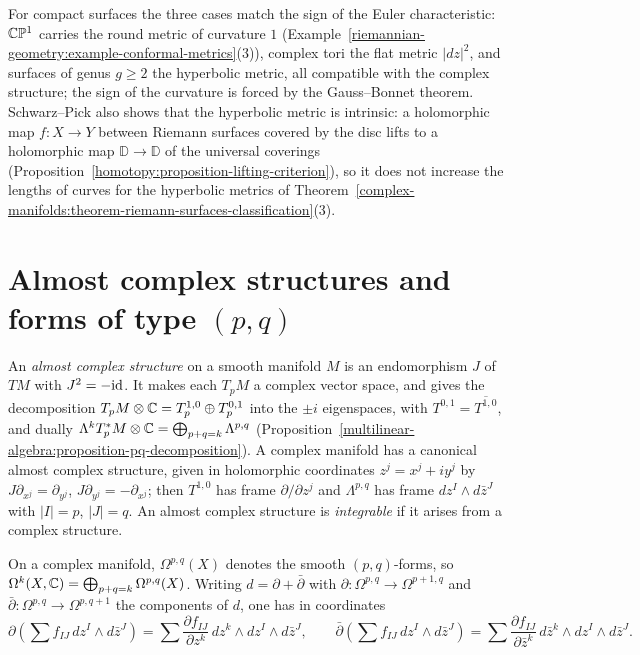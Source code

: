 \begin{remark}\label{complex-manifolds:remark-uniformisation-metrics}
For compact surfaces the three cases match the sign of the Euler characteristic: $\mathbb{C}\mathbb{P}^1$ carries the round metric of curvature $1$ (Example~\ref{riemannian-geometry:example-conformal-metrics}(3)),
complex tori the flat metric $|dz|^2$, and surfaces of genus $g \geq 2$ the hyperbolic metric, all compatible with the complex structure; the sign of the curvature is forced by the
Gauss--Bonnet theorem. Schwarz--Pick also shows that the hyperbolic metric is intrinsic: a holomorphic map $f \colon X \to Y$ between Riemann surfaces covered by the disc
lifts to a holomorphic map $\mathbb{D} \to \mathbb{D}$ of the universal coverings (Proposition~\ref{homotopy:proposition-lifting-criterion}), so it does not increase the lengths of
curves for the hyperbolic metrics of Theorem~\ref{complex-manifolds:theorem-riemann-surfaces-classification}(3).
\end{remark}

\section{Almost complex structures and forms of type $(p,q)$}\label{complex-manifolds:section-pq}

\begin{definition}\label{complex-manifolds:definition-almost-complex}
An \emph{almost complex structure} on a smooth manifold $M$ is an endomorphism $J$ of $TM$ with $J^2 = -\mathrm{id}$. It makes each $T_pM$ a complex vector space, and gives the decomposition
$T_pM \otimes \mathbb{C} = T^{1,0}_p \oplus T^{0,1}_p$ into the $\pm i$ eigenspaces, with $T^{0,1} = \overline{T^{1,0}}$, and dually
$\Lambda^k T^*_pM \otimes \mathbb{C} = \bigoplus_{p+q=k}\Lambda^{p,q}$ (Proposition~\ref{multilinear-algebra:proposition-pq-decomposition}). A complex manifold has a canonical almost complex structure, given in
holomorphic coordinates $z^j = x^j + iy^j$ by $J\partial_{x^j} = \partial_{y^j}$, $J\partial_{y^j} = -\partial_{x^j}$; then $T^{1,0}$ has frame $\partial/\partial z^j$ and $\Lambda^{p,q}$ has frame
$dz^I \wedge d\bar z^J$ with $|I| = p$, $|J| = q$. An almost complex structure is \emph{integrable} if it arises from a complex structure.
\end{definition}

\begin{definition}\label{complex-manifolds:definition-dbar}
On a complex manifold, $\Omega^{p,q}(X)$ denotes the smooth $(p,q)$-forms, so $\Omega^k(X, \mathbb{C}) = \bigoplus_{p+q=k}\Omega^{p,q}(X)$. Writing $d = \partial + \bar\partial$ with
$\partial \colon \Omega^{p,q} \to \Omega^{p+1,q}$ and $\bar\partial \colon \Omega^{p,q} \to \Omega^{p,q+1}$ the components of $d$, one has in coordinates
\[
\partial\left(\sum f_{IJ}\,dz^I \wedge d\bar z^J\right) = \sum\frac{\partial f_{IJ}}{\partial z^k}\,dz^k \wedge dz^I \wedge d\bar z^J, \qquad
\bar\partial\left(\sum f_{IJ}\,dz^I \wedge d\bar z^J\right) = \sum\frac{\partial f_{IJ}}{\partial\bar z^k}\,d\bar z^k \wedge dz^I \wedge d\bar z^J .
\]
\end{definition}

